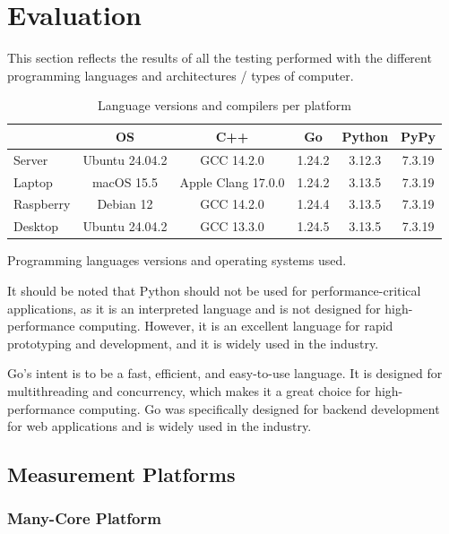 \chapter{Evaluation}\label{chap:evaluation}

This section reflects the results of all the testing performed with the different programming languages and architectures / types of computer.

\begin{table}[ht]
  \centering
  \begin{tabular}{lccccc}
    \toprule
               & \gls{OS}       & C++                  & Go       & Python & PyPy \\
    \midrule
    Server     & Ubuntu 24.04.2 &  GCC 14.2.0          & 1.24.2  & 3.12.3 & 7.3.19 \\
    Laptop     & macOS 15.5     &  Apple Clang 17.0.0  & 1.24.2  & 3.13.5 & 7.3.19 \\
    Raspberry  & Debian 12      &  GCC 14.2.0          & 1.24.4  & 3.13.5 & 7.3.19 \\
    Desktop    & Ubuntu 24.04.2 &  GCC 13.3.0          & 1.24.5  & 3.13.5 & 7.3.19 \\
    \bottomrule
  \end{tabular}
  \caption{Language versions and compilers per platform}{Programming languages versions and operating systems used.}
  \label{tab:lang-platforms}
\end{table}

It should be noted that Python should not be used for performance-critical applications, as it is an interpreted language and is not designed for high-performance computing. However, it is an excellent language for rapid prototyping and development, and it is widely used in the industry.

Go's intent is to be a fast, efficient, and easy-to-use language. It is designed for multithreading and concurrency, which makes it a great choice for high-performance computing. Go was specifically designed for backend development for web applications and is widely used in the industry.

\section{Measurement Platforms}

\subsection{Many-Core Platform}

